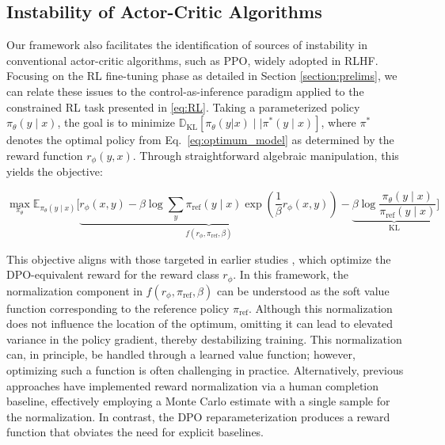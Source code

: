 \subsection{Instability of Actor-Critic Algorithms} Our framework also facilitates the identification of sources of instability in conventional actor-critic algorithms, such as PPO, widely adopted in RLHF. Focusing on the RL fine-tuning phase as detailed in Section \ref{section:prelims}, we can relate these issues to the control-as-inference paradigm \cite{levine2018reinforcement} applied to the constrained RL task presented in \ref{eq:RL}. Taking a parameterized policy $\pi_{\theta}(y\mid x)$, the goal is to minimize $\mathbb{D}_{\text{KL}}[\pi_{\theta}(y|x) \mid \mid \pi^*(y\mid x)]$, where $\pi^*$ denotes the optimal policy from Eq.~\ref{eq:optimum_model} as determined by the reward function $r_{\phi}(y, x)$. Through straightforward algebraic manipulation, this yields the objective:

\begin{equation}\label{eq:AC}
    \max_{\pi_{\theta}}\mathbb{E}_{\pi_{\theta}(y\mid x)}\bigg[\underbrace{r_{\phi}(x, y) -\beta\log\sum_{y}\pi_\text{ref}(y\mid x)\exp\left(\frac{1}{\beta}r_{\phi}(x, y)\right)}_{f(r_{\phi}, \pi_\text{ref}, \beta)} - \underbrace{\beta\log\frac{\pi_{\theta}(y\mid x)}{\pi_\text{ref}(y\mid x)}}_{\text{KL}}\bigg]
\end{equation}

This objective aligns with those targeted in earlier studies 
\citep{ziegler2020finetuning, stiennon2022learning, bai2022training, ouyang2022training}, which optimize the DPO-equivalent reward for the reward class $r_{\phi}$. In this framework, the normalization component in $f(r_{\phi}, \pi_\text{ref}, \beta)$ can be understood as the soft value function corresponding to the reference policy $\pi_\text{ref}$. Although this normalization does not influence the location of the optimum, omitting it can lead to elevated variance in the policy gradient, thereby destabilizing training. This normalization can, in principle, be handled through a learned value function; however, optimizing such a function is often challenging in practice. Alternatively, previous approaches have implemented reward normalization via a human completion baseline, effectively employing a Monte Carlo estimate with a single sample for the normalization. In contrast, the DPO reparameterization produces a reward function that obviates the need for explicit baselines. 

